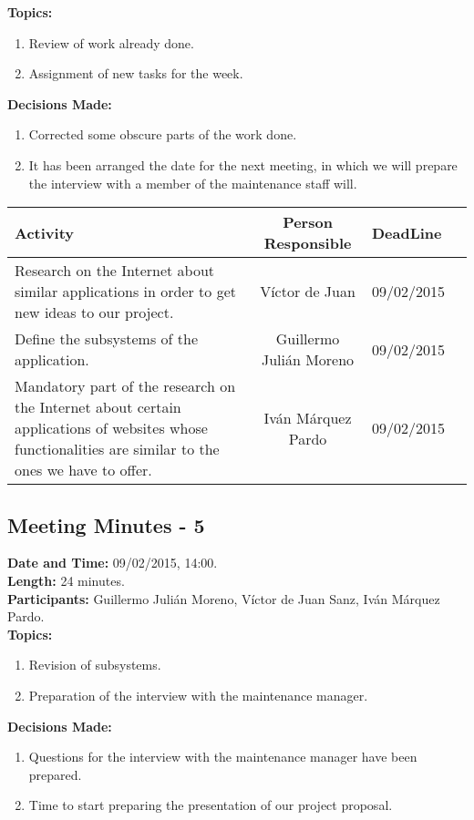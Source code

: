 \textbf{Topics: } 
\begin{enumerate}
\item Review of work already done.
\item Assignment of new tasks for the week.
\end{enumerate}

\textbf{Decisions Made:}\\
\begin{enumerate}
\item Corrected some obscure parts of the work done.
\item It has been arranged the date for the next meeting, in which we will prepare the interview with a member of the maintenance staff will.
\end{enumerate}

\begin{tabular}{|p{5cm} | c|p{5cm}| p{2cm}|}
\hline Activity & Person Responsible & DeadLine \\\hline
Research on the Internet about similar applications in order to get new ideas to our project. & Víctor de Juan & 09/02/2015\\\hline

Define the subsystems of the application. & Guillermo Julián Moreno & 09/02/2015\\\hline

Mandatory part of the research on the Internet about certain applications of websites whose functionalities are similar to the ones we have to offer. & Iván Márquez Pardo & 09/02/2015\\\hline
\end{tabular}


\subsection{Meeting Minutes - 5}
\textbf{Date and Time:} 09/02/2015, 14:00. \\
\textbf{Length:} 24 minutes. \\
\textbf{Participants: } Guillermo Julián Moreno, Víctor de Juan Sanz, Iván Márquez Pardo.\\

\textbf{Topics: } 
\begin{enumerate}
\item Revision of subsystems.
\item Preparation of the interview with the maintenance manager.
\end{enumerate}

\textbf{Decisions Made:}\\
\begin{enumerate}
\item Questions for the interview with the maintenance manager have been prepared.
\item Time to start preparing the presentation of our project proposal.
\end{enumerate}

